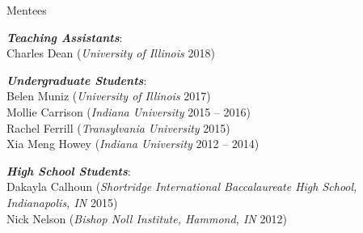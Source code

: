 \documentclass{resume} %
\begin{document}

\begin{rSection}{Mentees}

  {\bf \em Teaching Assistants}: \\
    Charles Dean ({\em University of Illinois} 2018)

  {\bf \em Undergraduate Students}: \\
    Belen Muniz ({\em University of Illinois} 2017)\\
    Mollie Carrison ({\em Indiana University} 2015 -- 2016)\\
    Rachel Ferrill ({\em Transylvania University} 2015) \\
    Xia Meng Howey ({\em Indiana University} 2012 -- 2014)

  {\bf \em High School Students}: \\
    Dakayla Calhoun ({\em Shortridge International Baccalaureate High
    School, Indianapolis, IN} 2015)\\
    Nick Nelson ({\em Bishop Noll Institute, Hammond, IN} 2012)

\end{rSection}
\end{document}
